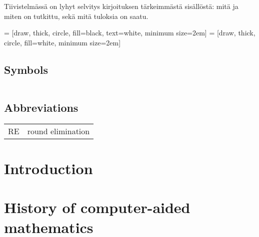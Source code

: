 \documentclass[english, 12pt, a4paper, sci, utf8, a-1b, online]{aaltothesis}
\date{2021}
\begin{document}
\makecoverpage{}

\makecopyrightpage{}

\begin{abstractpage}[english]
  \abstracttext{}
\end{abstractpage}

\newpage


\begin{abstractpage}[finnish]
  Tiivistelmässä on lyhyt selvitys
  kirjoituksen tärkeimmästä sisällöstä: mitä ja miten on tutkittu,
  sekä mitä tuloksia on saatu. 
\end{abstractpage}

\thesistableofcontents{}



\newcommand{\reline}[1]{\textbf{#1}}

 = [draw, thick, circle, fill=black, text=white, minimum size=2em]
 = [draw, thick, circle, fill=white, minimum size=2em]

\subsection*{Symbols}

\begin{tabular}{ll}
\end{tabular}

\subsection*{Abbreviations}

\begin{tabular}{ll}
RE         & round elimination
\end{tabular}

\cleardoublepage{}
\section{Introduction}

\thispagestyle{empty}

\clearpage
\section{History of computer-aided mathematics}
\end{document}
